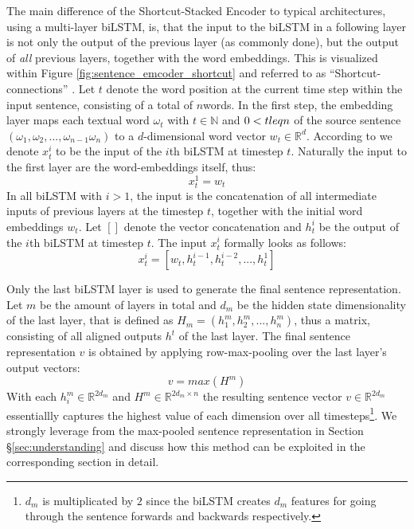 \noindent
The main difference of the Shortcut-Stacked Encoder to typical architectures, using a multi-layer \ac{biLSTM}, is, that the input to the \ac{biLSTM} in a following layer is not only the output of the previous layer (as commonly done), but the output of \textit{all} previous layers, together with the word embeddings. This is visualized within Figure \ref{fig:sentence_emcoder_shortcut} and referred to as ``Shortcut-connections'' \citep{nie2017shortcut}. Let $t$ denote the word position at the current time step within the input sentence, consisting of a total of $n$words. In the first step, the embedding layer maps each textual word $\omega_t$ with $t \in \mathbb{N}$ and $0 < t \\leq n$ of the source sentence $(\omega_1, \omega_2, ..., \omega_{n-1} \omega_n)$ to a $d$-dimensional word vector $w_t \in \mathbb{R}^d$. According to \cite{nie2017shortcut} we denote $x_t^i$ to be the input of the $i$th \ac{biLSTM} at timestep $t$. Naturally the input to the first layer are the word-embeddings itself, thus:
\begin{equation}
x_t^1 = w_t
\end{equation} 
In all \ac{biLSTM} with $i > 1$, the input is the concatenation of all intermediate inputs of previous layers at the timestep $t$, together with the initial word embeddings $w_t$. Let $[]$ denote the vector concatenation and $h^i_t$ be the output of the $i$th \ac{biLSTM} at timestep $t$. The input $x^i_t$ formally looks as follows:
\begin{equation}\label{eq:stacked_encoder_input}
x_t^i = [w_t, h_t^{i-1}, h_t^{i-2}, ... , h_t^1]
\end{equation}

\noindent
Only the last \ac{biLSTM} layer is used to generate the final sentence representation. Let $m$ be the amount of layers in total and $d_m$ be the hidden state dimensionality of the last layer, that is defined as $H_m=(h_1^m, h_2^m, ..., h_n^m)$, thus a matrix, consisting of all aligned outputs $h^t$ of the last layer. The final sentence representation $v$ is obtained by applying row-max-pooling over the last layer's output vectors:
\begin{equation}
v = max(H^m)
\end{equation}
With each $h_i^m \in \mathbb{R}^{2d_m}$ and $H^m \in \mathbb{R}^{2d_m \times n}$ the resulting sentence vector $v \in \mathbb{R}^{2d_m}$ essentiallly captures the highest value of each dimension over all timesteps\footnote{$d_m$ is multiplicated by $2$ since the \ac{biLSTM} creates $d_m$ features for going through the sentence forwards and backwards respectively.}. We strongly leverage from the max-pooled sentence representation in Section §\ref{sec:understanding} and discuss how this method can be exploited in the corresponding section in detail.
